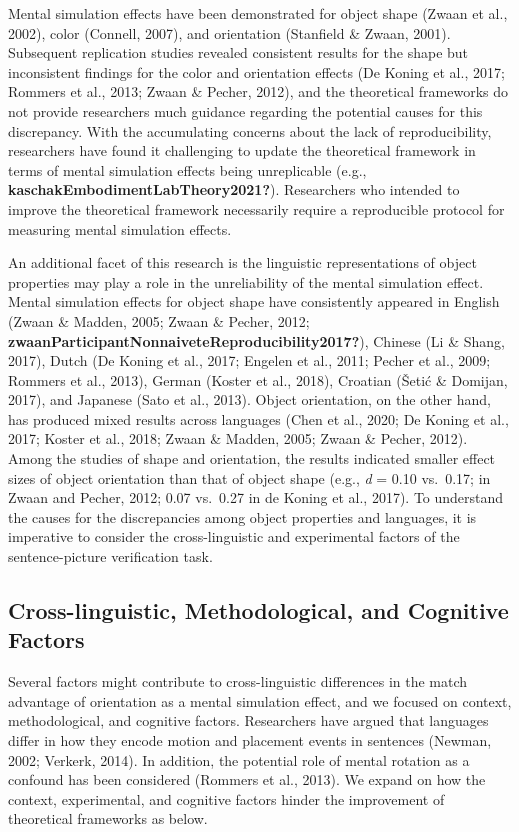 \documentclass[
  man]{apa7}
\begin{document}
Mental simulation effects have been demonstrated for object shape (Zwaan et al., 2002), color (Connell, 2007), and orientation (Stanfield \& Zwaan, 2001). Subsequent replication studies revealed consistent results for the shape but inconsistent findings for the color and orientation effects (De Koning et al., 2017; Rommers et al., 2013; Zwaan \& Pecher, 2012), and the theoretical frameworks do not provide researchers much guidance regarding the potential causes for this discrepancy. With the accumulating concerns about the lack of reproducibility, researchers have found it challenging to update the theoretical framework in terms of mental simulation effects being unreplicable (e.g., \textbf{kaschakEmbodimentLabTheory2021?}). Researchers who intended to improve the theoretical framework necessarily require a reproducible protocol for measuring mental simulation effects.

An additional facet of this research is the linguistic representations of object properties may play a role in the unreliability of the mental simulation effect. Mental simulation effects for object shape have consistently appeared in English (Zwaan \& Madden, 2005; Zwaan \& Pecher, 2012; \textbf{zwaanParticipantNonnaiveteReproducibility2017?}), Chinese (Li \& Shang, 2017), Dutch (De Koning et al., 2017; Engelen et al., 2011; Pecher et al., 2009; Rommers et al., 2013), German (Koster et al., 2018), Croatian (Šetić \& Domijan, 2017), and Japanese (Sato et al., 2013). Object orientation, on the other hand, has produced mixed results across languages (Chen et al., 2020; De Koning et al., 2017; Koster et al., 2018; Zwaan \& Madden, 2005; Zwaan \& Pecher, 2012). Among the studies of shape and orientation, the results indicated smaller effect sizes of object orientation than that of object shape (e.g., \emph{d} = 0.10 vs.~0.17; in Zwaan and Pecher, 2012; 0.07 vs.~0.27 in de Koning et al., 2017). To understand the causes for the discrepancies among object properties and languages, it is imperative to consider the cross-linguistic and experimental factors of the sentence-picture verification task.

\hypertarget{cross-linguistic-methodological-and-cognitive-factors}{%
\subsection{Cross-linguistic, Methodological, and Cognitive Factors}\label{cross-linguistic-methodological-and-cognitive-factors}}

Several factors might contribute to cross-linguistic differences in the match advantage of orientation as a mental simulation effect, and we focused on context, methodological, and cognitive factors. Researchers have argued that languages differ in how they encode motion and placement events in sentences (Newman, 2002; Verkerk, 2014). In addition, the potential role of mental rotation as a confound has been considered (Rommers et al., 2013). We expand on how the context, experimental, and cognitive factors hinder the improvement of theoretical frameworks as below.
\end{document}

